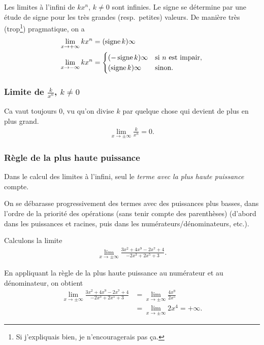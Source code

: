 \documentclass[main.tex]{subfiles}
\begin{document}
Les limites à l'infini de $k x^n$, $k \neq 0$ sont infinies.
Le signe se détermine par une étude de signe pour les très grandes (resp.\ petites) valeurs.
De manière très (trop\footnote{Si j'expliquais bien, je n'encouragerais pas ça.}) pragmatique,
on a
\begin{align*}
    \lim_{x \to +\infty} k x^n &= (\operatorname{signe} k) \infty\\
    \lim_{x \to -\infty} k x^n &=
    \begin{cases}
        (-\operatorname{signe} k) \infty & \text{si}\ n\ \text{est impair,} \\
        (\operatorname{signe} k) \infty & \text{sinon.}
    \end{cases}
\end{align*}

\subsubsection{Limite de $\frac k {x^n}$, $k \neq 0$}

Ca vaut toujours $0$,
vu qu'on divise $k$ par quelque chose qui devient de plus en plus grand.
\begin{align}
    \lim_{x \to \pm \infty} \frac k {x^n} = 0.
\end{align}

\subsubsection{Règle de la plus haute puissance}

\begin{remark}

    Dans le calcul des limites à l'infini,
    seul le \emph{terme avec la plus haute puissance} compte.

    On se débarasse progressivement des termes avec des puissances plus basses,
    dans l'ordre de la priorité des opérations (sans tenir compte des parenthèses)
    (d'abord dans les puissances et racines, puis dans les numérateurs/dénominateurs, etc.).
\end{remark}

\begin{example}

    Calculons la limite
    \begin{align*}
        \lim_{x \to \pm \infty} \frac {3x^2 + 4 x^9 - 2 x^7 + 4} {-2x^3 + 2x^5 + 3}.
    \end{align*}

    En appliquant la règle de la plus haute puissance au numérateur et au dénominateur,
    on obtient
    \begin{align*}
        \lim_{x \to \pm \infty} \frac {3x^2 + 4 x^9 - 2 x^7 + 4} {-2x^3 + 2x^5 + 3}
        &= \lim_{x \to \pm \infty} \frac {4 x^9} {2 x^5}\\
        &= \lim_{x \to \pm \infty} 2 x^4 = +\infty.
    \end{align*}
\end{example}
\end{document}
